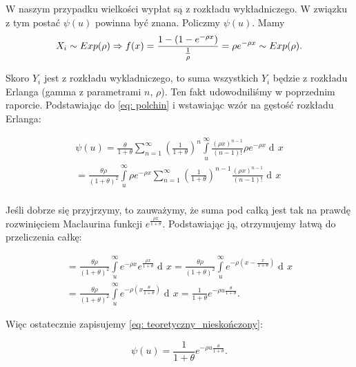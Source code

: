 \documentclass{article}
\theoremstyle{break}
\DeclareMathOperator{\diff}{d\!}
\numberwithin{equation}{subsection}
\numberwithin{figure}{section}
\begin{document}
W naszym przypadku wielkości wypłat są z rozkładu wykładniczego. W związku z tym postać $\psi(u)$ powinna być znana. Policzmy $\psi(u)$.
Mamy 
\begin{equation}
X_i\sim Exp(\rho) \Rightarrow f(x)=\frac{1-(1-e^{-\rho x})}{\frac{1}{\rho}}=\rho e^{-\rho x} \sim Exp(\rho).\\
\end{equation}

Skoro $Y_i$ jest z rozkładu wykladniczego, to suma wszystkich $Y_i$ będzie z rozkładu Erlanga (gamma z parametrami $n$, $\rho$). Ten fakt udowodniliśmy w poprzednim raporcie.
Podstawiając do \eqref{eq: polchin} i wstawiając wzór na gęstość rozkładu Erlanga:

\begin{gather}
	\psi(u)=\frac{\theta}{1+\theta}\sum_{n=1}^{\infty}\left(\frac{1}{1+\theta}\right)^n\int\limits_{u}^{\infty}\frac{(\rho x)^{n-1}}{(n-1)!} \rho e^{-\rho x}\diff{x} \\
	=\frac{\theta \rho}{(1+\theta)^2} \int\limits_{u}^{\infty}\rho e^{-\rho x}\sum_{n=1}^{\infty}\left(\frac{1}{1+\theta}\right)^{n-1}\frac{(\rho x)^{n-1}}{(n-1)!}\diff{x}\\
\end{gather}

Jeśli dobrze się przyjrzymy, to zauważymy, że suma pod całką jest tak na prawdę rozwinięciem Maclaurina funkcji $e^{\frac{\rho x}{1+\theta}}$. Podstawiając ją, otrzymujemy łatwą do przeliczenia całkę:

\begin{gather}
	=\frac{\theta\rho}{(1+\theta)^2}\int\limits_{u}^{\infty} e^{-\rho x} e^{\frac{\rho x}{1+\theta}}\diff{x}= \frac{\theta\rho}{(1+\theta)^2}\int\limits_{u}^{\infty} e^{-\rho (x-\frac{x}{1+\theta})}\diff{x}\\
	=\frac{\theta\rho}{(1+\theta)^2}\int\limits_{u}^{\infty} e^{-\rho (x\frac{\theta}{1+\theta})}\diff{x} = \frac{1}{1+\theta} e^{-\rho u \frac{\theta}{1+\theta}}.
\end{gather}

Więc ostatecznie zapisujemy \eqref{eq: teoretyczny_nieskończony}:

\begin{equation}
\psi(u) = \frac{1}{1+\theta} e^{-\rho u \frac{\theta}{1+\theta}}. \label{eq: teoretyczny_nieskończony}
\end{equation}
\end{document}
